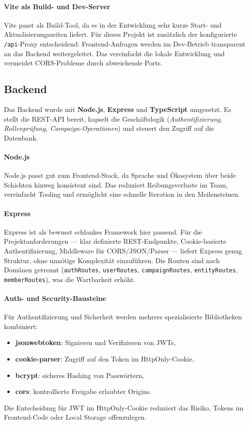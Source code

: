 \paragraph{Vite als Build- und Dev-Server}
Vite passt als Build-Tool, da es in der Entwicklung sehr kurze
Start- und Aktualisierungszeiten liefert.
Für dieses Projekt ist zusätzlich der konfigurierte \texttt{/api}-Proxy
entscheidend: Frontend-Anfragen werden im Dev-Betrieb transparent an das
Backend weitergeleitet.
Das vereinfacht die lokale Entwicklung und vermeidet CORS-Probleme durch
abweichende Ports.

\subsection{Backend}

Das Backend wurde mit \textbf{Node.js}, \textbf{Express} und \textbf{TypeScript}
umgesetzt.
Es stellt die REST-API bereit, kapselt die Geschäftslogik
(\emph{Authentifizierung, Rollenprüfung, Campaign-Operationen}) und steuert den
Zugriff auf die Datenbank.

\paragraph{Node.js}
Node.js passt gut zum Frontend-Stack, da Sprache und
Ökosystem über beide Schichten hinweg konsistent sind.
Das reduziert Reibungsverluste im Team, vereinfacht Tooling und ermöglicht eine
schnelle Iteration in den Meilensteinen.

\paragraph{Express}
Express ist als bewusst schlankes Framework hier passend.
Für die Projektanforderungen --- klar definierte REST-Endpunkte,
Cookie-basierte Authentifizierung, Middleware für CORS/JSON/Parser ---
liefert Express genug Struktur, ohne unnötige Komplexität einzuführen.
Die Routen sind nach Domänen getrennt
(\texttt{authRoutes}, \texttt{userRoutes}, \texttt{campaignRoutes},
\texttt{entityRoutes}, \texttt{memberRoutes}), was die Wartbarkeit erhöht.

\paragraph{Auth- und Security-Bausteine}
Für Authentifizierung und Sicherheit werden mehrere spezialisierte Bibliotheken
kombiniert:
\begin{itemize}
  \item \textbf{jsonwebtoken}: Signieren und Verifizieren von JWTs,
  \item \textbf{cookie-parser}: Zugriff auf den Token im HttpOnly-Cookie,
  \item \textbf{bcrypt}: sicheres Hashing von Passwörtern,
  \item \textbf{cors}: kontrollierte Freigabe erlaubter Origins.
\end{itemize}
Die Entscheidung für JWT im HttpOnly-Cookie reduziert das Risiko, Tokens im
Frontend-Code oder Local Storage offenzulegen.

